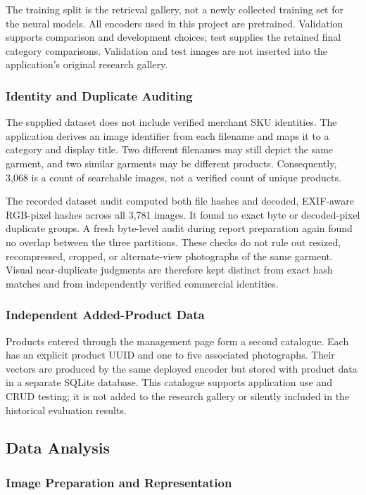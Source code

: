 The training split is the retrieval gallery, not a newly collected training
set for the neural models. All encoders used in this project are pretrained.
Validation supports comparison and development choices; test supplies the
retained final category comparisons. Validation and test images are not inserted
into the application's original research gallery.

\subsubsection{Identity and Duplicate Auditing}
The supplied dataset does not include verified merchant SKU identities. The
application derives an image identifier from each filename and maps it to a
category and display title. Two different filenames may still depict the same
garment, and two similar garments may be different products. Consequently,
3,068 is a count of searchable images, not a verified count of unique products.

The recorded dataset audit computed both file hashes and decoded, EXIF-aware
RGB-pixel hashes across all 3,781 images. It found no exact byte or decoded-pixel
duplicate groups. A fresh byte-level audit during report preparation again found
no overlap between the three partitions. These checks do not rule out resized,
recompressed, cropped, or alternate-view photographs of the same garment.
Visual near-duplicate judgments are therefore kept distinct from exact hash
matches and from independently verified commercial identities.

\subsubsection{Independent Added-Product Data}
Products entered through the management page form a second catalogue. Each has
an explicit product UUID and one to five associated photographs. Their vectors
are produced by the same deployed encoder but stored with product data in a
separate SQLite database. This catalogue supports application use and CRUD
testing; it is not added to the research gallery or silently included in the
historical evaluation results.

\subsection{Data Analysis}
\subsubsection{Image Preparation and Representation}
